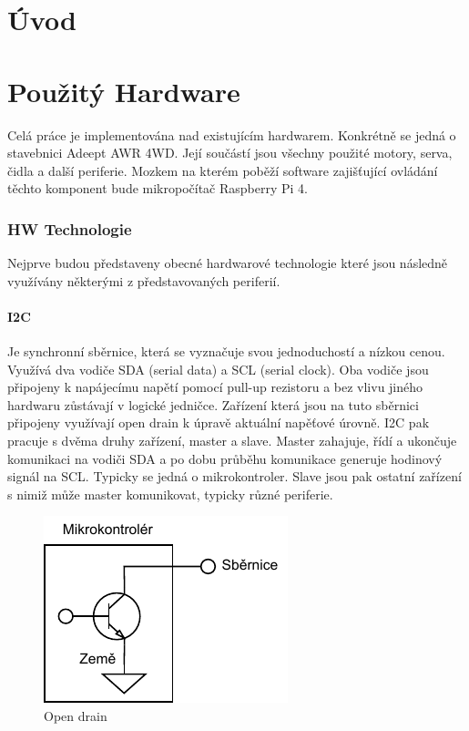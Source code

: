
%

\chapter{Úvod}

\chapter{Použitý Hardware}
Celá práce je implementována nad existujícím hardwarem. Konkrétně se jedná o stavebnici Adeept AWR 4WD. Její součástí jsou všechny použité motory, serva, čidla a další periferie. Mozkem na kterém poběží software zajišťující ovládání těchto komponent bude mikropočítač Raspberry Pi 4.

\subsection*{HW Technologie}
Nejprve budou představeny obecné hardwarové technologie které jsou následně využívány některými z představovaných periferií.

\subsubsection{I2C}
Je synchronní sběrnice, která se vyznačuje svou jednoduchostí a nízkou cenou. Využívá dva vodiče SDA (serial data) a SCL (serial clock). Oba vodiče jsou připojeny k napájecímu napětí pomocí pull-up rezistoru a bez vlivu jiného hardwaru zůstávají v logické jedničce. Zařízení která jsou na tuto sběrnici připojeny využívají open drain k úpravě aktuální napěťové úrovně. I2C pak pracuje s dvěma druhy zařízení, master a slave. Master zahajuje, řídí a ukončuje komunikaci na vodiči SDA a po dobu průběhu komunikace generuje hodinový signál na SCL. Typicky se jedná o mikrokontroler. Slave jsou pak ostatní zařízení s nimiž může master komunikovat, typicky různé periferie. \cite{embeded_robotics}

\begin{figure}[h!]
	\centering
	\includegraphics[scale=1]{obrazky-figures/open_drain.pdf}
	\caption{Open drain}
	\label{}
\end{figure}

